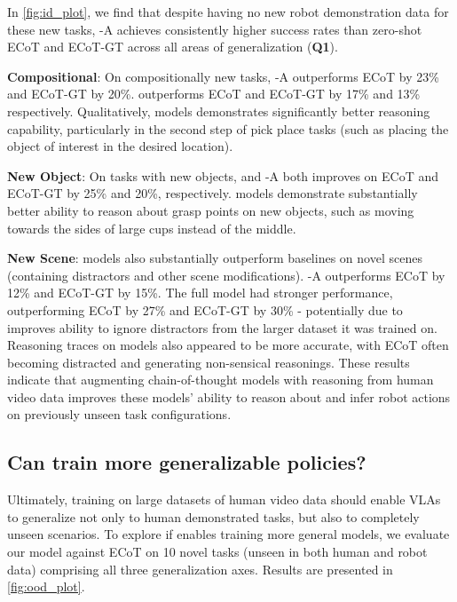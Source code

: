 In \cref{fig:id_plot}, we find that despite having no new robot demonstration data for these new tasks, \ACRO-A achieves consistently higher success rates than zero-shot ECoT and ECoT-GT across all areas of generalization (\textbf{Q1}). 

\smallskip \noindent \textbf{Compositional}: On compositionally new tasks, \ACRO-A outperforms ECoT by 23\% and ECoT-GT by 20\%. \ACRO outperforms ECoT and ECoT-GT by 17\% and 13\% respectively. Qualitatively, \ACRO models demonstrates significantly better reasoning capability, particularly in the second step of pick place tasks (such as  placing the object of interest in the desired location).

\smallskip \noindent \textbf{New Object}: On tasks with new objects, \ACRO and \ACRO-A both improves on ECoT and ECoT-GT by 25\% and 20\%, respectively. \ACRO models demonstrate substantially better ability to reason about grasp points on new objects, such as moving towards the sides of large cups instead of the middle. 

\smallskip \noindent \textbf{New Scene}: \ACRO models also substantially outperform baselines on novel scenes (containing  distractors and other scene modifications). \ACRO-A outperforms ECoT by 12\% and ECoT-GT by 15\%. The full \ACRO model had stronger performance, outperforming ECoT by 27\% and ECoT-GT by 30\% - potentially due to improves ability to ignore distractors from the larger dataset it was trained on. Reasoning traces on \ACRO models also appeared to be more accurate, with ECoT often becoming distracted and generating non-sensical reasonings.
These results indicate that augmenting chain-of-thought models with reasoning from human video data improves these models' ability to reason about and infer robot actions on previously unseen task configurations.

\subsection{Can \ACRO train more generalizable policies?}\label{sec:experiments:generalization}

Ultimately, training on large datasets of human video data should enable VLAs to generalize not only to human demonstrated tasks, but also to completely unseen scenarios. To explore if \ACRO enables training more general models, we evaluate our model against ECoT on 10 novel tasks (unseen in both human and robot data) comprising all three generalization axes. Results are presented in \cref{fig:ood_plot}.


